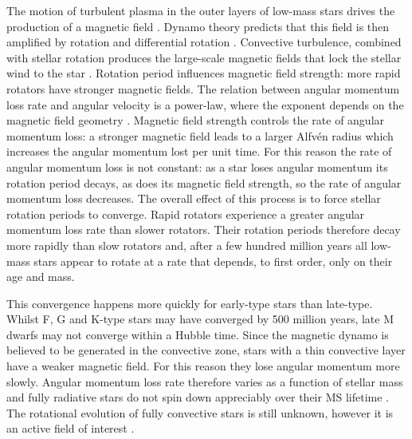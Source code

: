 The motion of turbulent plasma in the outer layers of low-mass stars drives
the production of a magnetic field \citep[][]{Schatzman1962}.
Dynamo theory predicts that this field is then amplified by rotation and
differential rotation \citep[\eg][]{Parker1970}.
Convective turbulence, combined with stellar rotation produces the large-scale
magnetic fields that lock the stellar wind to the star
\citep[\eg][]{Charbonneau2010}.
Rotation period influences magnetic field strength: more rapid rotators have
stronger magnetic fields.
The relation between angular momentum loss rate and angular velocity is a
power-law, where the exponent depends on the magnetic field geometry
\citep{Mestel1984, Kawaler1988}.
Magnetic field strength controls the rate of angular momentum loss: a stronger
magnetic field leads to a larger Alfv{\'e}n radius which increases the angular
momentum lost per unit time.
For this reason the rate of angular momentum loss is not constant: as a star
loses angular momentum its rotation period decays, as does its magnetic field
strength, so the rate of angular momentum loss decreases.
The overall effect of this process is to force stellar rotation periods to
converge.
Rapid rotators experience a greater angular momentum loss rate than slower
rotators.
Their rotation periods therefore decay more rapidly than slow rotators and,
after a few hundred million years all low-mass stars appear to rotate at a
rate that depends, to first order, only on their age and mass.

This convergence happens more quickly for early-type stars than late-type.
Whilst F, G and K-type stars may have converged by 500 million years,
\citep{Radick1987, Irwin2009} late M dwarfs may not converge within a Hubble
time.
Since the magnetic dynamo is believed to be generated in the convective zone,
stars with a thin convective layer have a weaker magnetic field.
For this reason they lose angular momentum more slowly.
Angular momentum loss rate therefore varies as a function of stellar mass and
fully radiative stars do not spin down appreciably over their MS lifetime
\citep{Noyes1984b}.
The rotational evolution of fully convective stars is still unknown, however
it is an active field of interest \citep[\eg][]{Mcquillan2013, Newton2015}.


